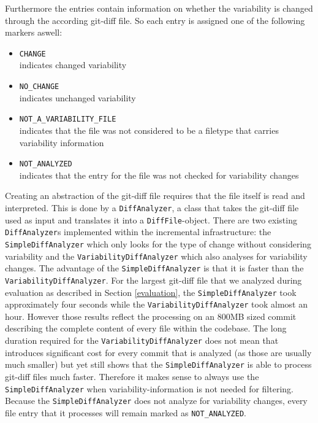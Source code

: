 \documentclass[a4paper]{article}
\begin{document}
Furthermore the entries contain information on whether the variability is changed through the according git-diff file. So each entry is assigned one of the following markers aswell:

\begin{itemize}
	\item \texttt{CHANGE} \\
	      indicates changed variability
	\item \texttt{NO\_CHANGE} \\
	      indicates unchanged variability
	\item \texttt{NOT\_A\_VARIABILITY\_FILE}\\
	      indicates that the file was not considered to be a filetype that carries variability information
	\item \texttt{NOT\_ANALYZED}\\
	      indicates that the entry for the file was not checked for variability changes
\end{itemize}

Creating an abstraction of the git-diff file requires that the file itself is read and interpreted. This is done by a \texttt{DiffAnalyzer}, a class that takes the git-diff file used as input and translates it into a \texttt{DiffFile}-object. There are two existing \texttt{DiffAnalyzer}s implemented within the incremental infrastructure: the \texttt{SimpleDiffAnalyzer} which only looks for the type of change without considering variability and the \texttt{VariabilityDiffAnalyzer} which also analyses for variability changes. The advantage of the \texttt{SimpleDiffAnalyzer} is that it is faster than the \texttt{VariabilityDiffAnalyzer}. For the largest git-diff file that we analyzed during evaluation as described in Section \ref{evaluation}, the \texttt{SimpleDiffAnalyzer} took approximately four seconds while the \texttt{VariabilityDiffAnalyzer} took almost an hour. However those results reflect the processing on an 800MB sized commit describing the complete content of every file within the codebase. The long duration required for the \texttt{VariabilityDiffAnalyzer} does not mean that introduces significant cost for every commit that is analyzed (as those are usually much smaller) but yet still shows that the \texttt{SimpleDiffAnalyzer} is able to process git-diff files much faster.
Therefore it makes sense to always use the \texttt{SimpleDiffAnalyzer} when variability-information is not needed for filtering. Because the \texttt{SimpleDiffAnalyzer} does not analyze for variability changes, every file entry that it processes will remain marked as \texttt{NOT\_ANALYZED}.
\end{document}
